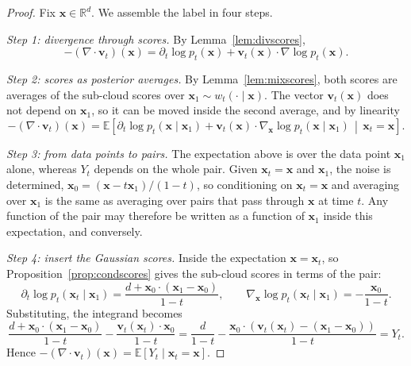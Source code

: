 \documentclass[11pt,a4paper]{article}
\numberwithin{equation}{section}     %
\theoremstyle{plain}        %
\theoremstyle{definition}   %
\theoremstyle{remark}       %
\begin{document}
\begin{proof}
Fix $\mathbf{x}\in\mathbb{R}^d$. We assemble the label in four steps.

\emph{Step 1: divergence through scores.} By Lemma~\ref{lem:divscores},
\[
-\left(\nabla\cdot\mathbf{v}_t\right)(\mathbf{x})=\partial_t\log p_t(\mathbf{x})+\mathbf{v}_t(\mathbf{x})\cdot\nabla\log p_t(\mathbf{x}).
\]

\emph{Step 2: scores as posterior averages.} By Lemma~\ref{lem:mixscores}, both scores are averages of the sub-cloud scores over $\mathbf{x}_1\sim w_t(\cdot\mid\mathbf{x})$. The vector $\mathbf{v}_t(\mathbf{x})$ does not depend on $\mathbf{x}_1$, so it can be moved inside the second average, and by linearity
\[
-\left(\nabla\cdot\mathbf{v}_t\right)(\mathbf{x})=\mathbb{E}\left[\partial_t\log p_t(\mathbf{x}\mid\mathbf{x}_1)+\mathbf{v}_t(\mathbf{x})\cdot\nabla_{\mathbf{x}}\log p_t(\mathbf{x}\mid\mathbf{x}_1)\,\middle|\,\mathbf{x}_t=\mathbf{x}\right].
\]

\emph{Step 3: from data points to pairs.} The expectation above is over the data point $\mathbf{x}_1$ alone, whereas $Y_t$ depends on the whole pair. Given $\mathbf{x}_t=\mathbf{x}$ and $\mathbf{x}_1$, the noise is determined, $\mathbf{x}_0=(\mathbf{x}-t\mathbf{x}_1)/(1-t)$, so conditioning on $\mathbf{x}_t=\mathbf{x}$ and averaging over $\mathbf{x}_1$ is the same as averaging over pairs that pass through $\mathbf{x}$ at time $t$. Any function of the pair may therefore be written as a function of $\mathbf{x}_1$ inside this expectation, and conversely.

\emph{Step 4: insert the Gaussian scores.} Inside the expectation $\mathbf{x}=\mathbf{x}_t$, so Proposition~\ref{prop:condscores} gives the sub-cloud scores in terms of the pair:
\[
\partial_t\log p_t(\mathbf{x}_t\mid\mathbf{x}_1)=\frac{d+\mathbf{x}_0\cdot(\mathbf{x}_1-\mathbf{x}_0)}{1-t},
\qquad
\nabla_{\mathbf{x}}\log p_t(\mathbf{x}_t\mid\mathbf{x}_1)=-\frac{\mathbf{x}_0}{1-t}.
\]
Substituting, the integrand becomes
\[
\frac{d+\mathbf{x}_0\cdot(\mathbf{x}_1-\mathbf{x}_0)}{1-t}-\frac{\mathbf{v}_t(\mathbf{x}_t)\cdot\mathbf{x}_0}{1-t}
=\frac{d}{1-t}-\frac{\mathbf{x}_0\cdot\left(\mathbf{v}_t(\mathbf{x}_t)-(\mathbf{x}_1-\mathbf{x}_0)\right)}{1-t}=Y_t .
\]
Hence $-(\nabla\cdot\mathbf{v}_t)(\mathbf{x})=\mathbb{E}[Y_t\mid\mathbf{x}_t=\mathbf{x}]$.
\end{proof}
\end{document}
